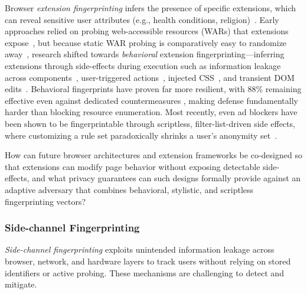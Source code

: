 Browser \textit{extension fingerprinting} infers the presence of specific extensions, which can reveal sensitive user attributes (e.g., health conditions, religion)~\cite{karamiCarnusExploringPrivacy2020}.
%
Early approaches relied on probing web-accessible resources (WARs) that extensions expose~\cite{starovXHOUNDQuantifyingFingerprintability2017,starovExtendedTrackingPowers2017,starovUnnecessarilyIdentifiableQuantifying2019}, but because static WAR probing is comparatively easy to randomize away~\cite{trickelEveryoneDifferentClientside2019}, research shifted towards \textit{behavioral} extension fingerprinting---inferring extensions through side-effects during execution such as information leakage across components~\cite{chenMystiqueUncoveringInformation2018}, user-triggered actions~\cite{solomosDangersHumanTouch2022}, injected CSS~\cite{laperdrixFingerprintingStyleDetecting2021}, and transient DOM edits~\cite{solomosEscapingConfinesTime2022}.
%
Behavioral fingerprints have proven far more resilient, with 88\% remaining effective even against dedicated countermeasures \cite{karamiCarnusExploringPrivacy2020}, making defense fundamentally harder than blocking resource enumeration.
%
Most recently, even ad blockers have been shown to be fingerprintable through scriptless, filter-list-driven side effects, where customizing a rule set paradoxically shrinks a user's anonymity set~\cite{chehade2025double}.

\begin{opbox}
How can future browser architectures and extension frameworks be co-designed so that extensions can modify page behavior without exposing detectable side-effects, and what privacy guarantees can such designs formally provide against an adaptive adversary that combines behavioral, stylistic, and scriptless fingerprinting vectors?
\end{opbox}


\subsubsection{Side-channel Fingerprinting} 
\label{sec:stateless-techniques-side-channel-fingperinting}

\textit{Side-channel fingerprinting} exploits unintended information leakage across browser, network, and hardware layers to track users without relying on stored identifiers or active probing. These mechanisms are challenging to detect and mitigate.
%
%


